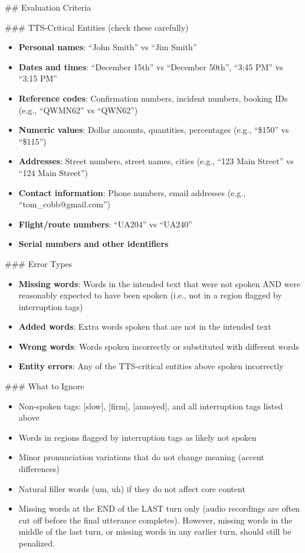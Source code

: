 \begin{tcolorbox}[promptbox, title={\small User Speech Fidelity Prompt}]
        \#\# Evaluation Criteria\newline

        \#\#\# TTS-Critical Entities (check these carefully)
        \begin{itemize}
          \item \textbf{Personal names}: ``John Smith'' vs ``Jim Smith''
          \item \textbf{Dates and times}: ``December 15th'' vs ``December 50th'', ``3:45 PM'' vs ``3:15 PM''
          \item \textbf{Reference codes}: Confirmation numbers, incident numbers, booking IDs (e.g., ``QWMN62'' vs ``QWN62'')
          \item \textbf{Numeric values}: Dollar amounts, quantities, percentages (e.g., ``\$150'' vs ``\$115'')
          \item \textbf{Addresses}: Street numbers, street names, cities (e.g., ``123 Main Street'' vs ``124 Main Street'')
          \item \textbf{Contact information}: Phone numbers, email addresses (e.g., ``tom\_cobb@gmail.com'')
          \item \textbf{Flight/route numbers}: ``UA204'' vs ``UA240''
          \item \textbf{Serial numbers and other identifiers}
        \end{itemize}

        \#\#\# Error Types
        \begin{itemize}
          \item \textbf{Missing words}: Words in the intended text that were not spoken AND were reasonably expected to have been spoken (i.e., not in a region flagged by interruption tags)
          \item \textbf{Added words}: Extra words spoken that are not in the intended text
          \item \textbf{Wrong words}: Words spoken incorrectly or substituted with different words
          \item \textbf{Entity errors}: Any of the TTS-critical entities above spoken incorrectly
        \end{itemize}

        \#\#\# What to Ignore
        \begin{itemize}
          \item Non-spoken tags: [slow], [firm], [annoyed], and all interruption tags listed above
          \item Words in regions flagged by interruption tags as likely not spoken
          \item Minor pronunciation variations that do not change meaning (accent differences)
          \item Natural filler words (um, uh) if they do not affect core content
          \item Missing words at the END of the LAST turn only (audio recordings are often cut off before the final utterance completes). However, missing words in the middle of the last turn, or missing words in any earlier turn, should still be penalized.
        \end{itemize}


\end{tcolorbox}
